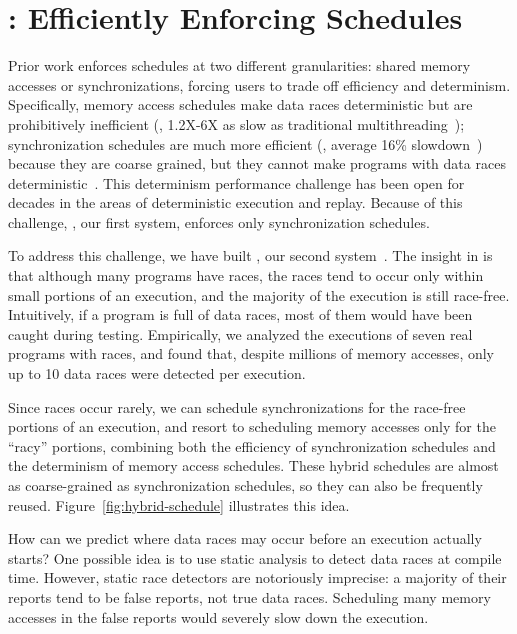 \section{\peregrine: Efficiently Enforcing Schedules} \label{sec:peregrine}


Prior work enforces schedules at two different granularities: shared
memory accesses or synchronizations, forcing users to trade off efficiency
and determinism.  Specifically, memory access schedules make data races
deterministic but are prohibitively inefficient (\eg, 1.2X-6X as slow as
traditional multithreading~\cite{coredet:asplos10}); synchronization
schedules are much more efficient (\eg, average 16\%
slowdown~\cite{kendo:asplos09}) because they are coarse grained, but they
cannot make programs with data races deterministic~\cite{lu:concurrency-bugs,syncfinder:osdi10}.
This determinism \vs performance challenge has been open for decades in the areas of
deterministic execution and replay.  Because of this challenge, 
\tern, our first \smt system, enforces only synchronization schedules.

To address this challenge, we have built \peregrine, our second \smt
system~\cite{peregrine:sosp11}.  The insight in \peregrine is that although
many programs have races, the races tend to occur only within small
portions of an execution, and the majority of the execution is still
race-free.  Intuitively, if a program is full of data races, most of them
would have been caught during testing.  Empirically, we analyzed the
executions of seven real programs with races, and found that, despite
millions of memory accesses, only up to 10 data races were detected per
execution.

Since races occur rarely, we can schedule synchronizations for the
race-free portions of an execution, and resort to scheduling memory
accesses only for the ``racy'' portions, combining both the efficiency of
synchronization schedules and the determinism of memory access schedules.
These hybrid schedules are almost as coarse-grained as synchronization
schedules, so they can also be frequently reused.  
Figure~\ref{fig:hybrid-schedule} illustrates this idea.

How can we predict where data races may occur before an execution actually
starts?  One possible idea is to use static analysis to detect data races
at compile time.
However, static race detectors are notoriously imprecise: a majority of
their reports tend to be false reports, not true data races.  Scheduling
many memory accesses in the false reports would severely slow down the
execution.

